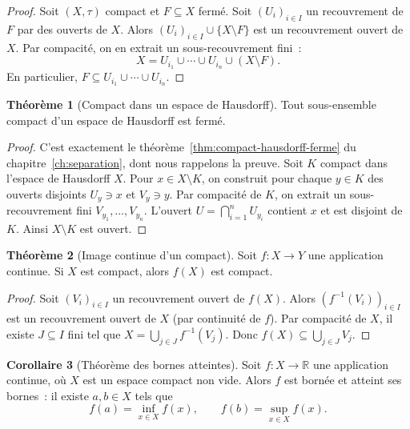 \documentclass[12pt,a4paper,openany]{book}
\theoremstyle{definition}
\theoremstyle{cours}
\newtheorem{theoreme}{Théorème}[chapter]
\newtheorem{corollaire}[theoreme]{Corollaire}
\theoremstyle{coursnormal}
\newcommand{\R}{\mathbb{R}}
\begin{document}
\begin{proof}
  Soit $(X,\tau)$ compact et $F\subseteq X$ fermé. Soit $(U_i)_{i\in I}$ un
  recouvrement de $F$ par des ouverts de $X$. Alors
  $(U_i)_{i\in I}\cup\{X\setminus F\}$ est un recouvrement ouvert de $X$. Par
  compacité, on en extrait un sous-recouvrement fini~:
  \[
    X = U_{i_1}\cup\cdots\cup U_{i_n}\cup(X\setminus F).
  \]
  En particulier, $F\subseteq U_{i_1}\cup\cdots\cup U_{i_n}$.
\end{proof}

\begin{theoreme}[Compact dans un espace de Hausdorff]\label{thm:compact-dans-hausdorff}
  Tout sous-ensemble compact d'un espace de Hausdorff est fermé.
\end{theoreme}

\begin{proof}
  C'est exactement le théorème~\ref{thm:compact-hausdorff-ferme} du
  chapitre~\ref{ch:separation}, dont nous rappelons la preuve. Soit $K$ compact
  dans l'espace de Hausdorff $X$. Pour $x\in X\setminus K$, on construit pour
  chaque $y\in K$ des ouverts disjoints $U_y\ni x$ et $V_y\ni y$. Par
  compacité de $K$, on extrait un sous-recouvrement fini $V_{y_1},\ldots,V_{y_n}$.
  L'ouvert $U=\bigcap_{i=1}^n U_{y_i}$ contient $x$ et est disjoint de $K$.
  Ainsi $X\setminus K$ est ouvert.
\end{proof}

\begin{theoreme}[Image continue d'un compact]\label{thm:image-continue-compact}
  Soit $f\colon X\to Y$ une application continue. Si $X$ est compact, alors
  $f(X)$ est compact.
\end{theoreme}

\begin{proof}
  Soit $(V_i)_{i\in I}$ un recouvrement ouvert de $f(X)$. Alors
  $(f^{-1}(V_i))_{i\in I}$ est un recouvrement ouvert de $X$ (par continuité
  de $f$). Par compacité de $X$, il existe $J\subseteq I$ fini tel que
  $X=\bigcup_{j\in J}f^{-1}(V_j)$. Donc $f(X)\subseteq\bigcup_{j\in J}V_j$.
\end{proof}

\begin{corollaire}[Théorème des bornes atteintes]\label{cor:cor:bornes-atteintes}
  Soit $f\colon X\to\R$ une application continue, où $X$ est un espace compact
  non vide. Alors $f$ est bornée et
  atteint ses bornes~: il existe $a,b\in X$ tels que
  \[
    f(a) = \inf_{x\in X} f(x),\qquad f(b) = \sup_{x\in X} f(x).
  \]
\end{corollaire}
\end{document}
